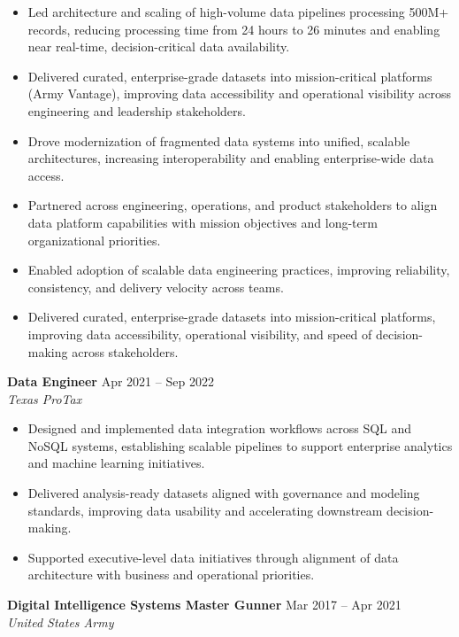 \begin{itemize}
    \item Led architecture and scaling of high-volume data pipelines processing 500M+ records, reducing processing time from 24 hours to 26 minutes and enabling near real-time, decision-critical data availability.
    \item Delivered curated, enterprise-grade datasets into mission-critical platforms (Army Vantage), improving data accessibility and operational visibility across engineering and leadership stakeholders.
    \item Drove modernization of fragmented data systems into unified, scalable architectures, increasing interoperability and enabling enterprise-wide data access.
    \item Partnered across engineering, operations, and product stakeholders to align data platform capabilities with mission objectives and long-term organizational priorities.
    \item Enabled adoption of scalable data engineering practices, improving reliability, consistency, and delivery velocity across teams.
    \item Delivered curated, enterprise-grade datasets into mission-critical platforms, improving data accessibility, operational visibility, and speed of decision-making across stakeholders.
\end{itemize}

\vspace{4pt}

\textbf{Data Engineer} \hfill Apr 2021 -- Sep 2022\\
\textit{Texas ProTax}

\begin{itemize}
    \item Designed and implemented data integration workflows across SQL and NoSQL systems, establishing scalable pipelines to support enterprise analytics and machine learning initiatives.
    \item Delivered analysis-ready datasets aligned with governance and modeling standards, improving data usability and accelerating downstream decision-making.
    \item Supported executive-level data initiatives through alignment of data architecture with business and operational priorities.
\end{itemize}

\vspace{4pt}

\textbf{Digital Intelligence Systems Master Gunner} \hfill Mar 2017 -- Apr 2021\\
\textit{United States Army}

